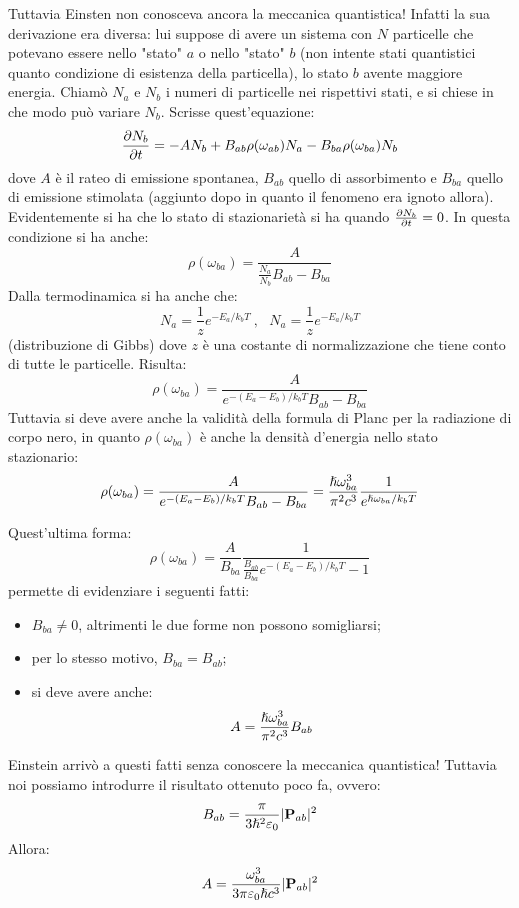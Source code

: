 Tuttavia Einsten non conosceva ancora la meccanica quantistica! Infatti la sua derivazione era diversa: lui suppose di avere un sistema con $N$ particelle che potevano essere nello "stato" $a$ o nello "stato" $b$ (non intente stati quantistici quanto condizione di esistenza della particella), lo stato $b$ avente maggiore energia. Chiamò $N_a$ e $N_b$ i numeri di particelle nei rispettivi stati, e si chiese in che modo può variare $N_b$. Scrisse quest'equazione:
\[
    \frac{\partial N_b}{\partial t} = -A N_b + B_{ab} \rho(\omega_{ab})N_a - B_{ba} \rho(\omega_{ba})N_b
\]
dove $A$ è il rateo di emissione spontanea, $B_{ab}$ quello di assorbimento e $B_{ba}$ quello di emissione stimolata (aggiunto dopo in quanto il fenomeno era ignoto allora). Evidentemente si ha che lo stato di stazionarietà si ha quando $\frac{\partial N_b}{\partial t} = 0$. In questa condizione si ha anche:
\[
    \rho(\omega_{ba}) = \frac{A}{\frac{N_a}{N_b}B_{ab} - B_{ba}}
\]
Dalla termodinamica si ha anche che:
\[
    N_a = \frac{1}{z} e^{-E_a / k_b T}\ , \ \ \ N_a = \frac{1}{z} e^{-E_a / k_b T}
\]
(distribuzione di Gibbs) dove $z$ è una costante di normalizzazione che tiene conto di tutte le particelle. Risulta:
\[
    \rho(\omega_{ba}) = \frac{A}{e^{-(E_a-E_b)/k_bT}B_{ab} - B_{ba}}
\]
Tuttavia si deve avere anche la validità della formula di Planc per la radiazione di corpo nero, in quanto $\rho(\omega_{ba})$ è anche la densità d'energia nello stato stazionario:
\[
    \rho(\omega_{ba}) = \frac{A}{e^{-(E_a-E_b)/k_bT}B_{ab} - B_{ba}} = \frac{\hslash\omega_{ba}^3}{\pi^2c^3}\frac{1}{e^{\hslash\omega_{ba}/k_bT}}
\]

Quest'ultima forma:
\[
    \rho(\omega_{ba}) = \frac{A}{B_{ba}}\frac{1}{\frac{B_{ab}}{B_{ba}} e^{-(E_a-E_b)/k_bT} - 1}
\]
permette di evidenziare i seguenti fatti:
\begin{itemize}
    \item $B_{ba} \neq 0$, altrimenti le due forme non possono somigliarsi;
    \item per lo stesso motivo, $B_{ba} = B_{ab}$;
    \item si deve avere anche: \[
        A = \frac{\hslash\omega_{ba}^3}{\pi^2c^3} B_{ab}
    \]
\end{itemize}

Einstein arrivò a questi fatti senza conoscere la meccanica quantistica! Tuttavia noi possiamo introdurre il risultato ottenuto poco fa, ovvero:
\[
    B_{ab} = \frac{\pi}{3\hslash^2\varepsilon_0} |\mathbf{P}_{ab}|^2
\]
Allora:
\[
    A = \frac{\omega_{ba}^3}{3\pi \varepsilon_0 \hslash c^3}|\mathbf{P}_{ab}|^2
\]

